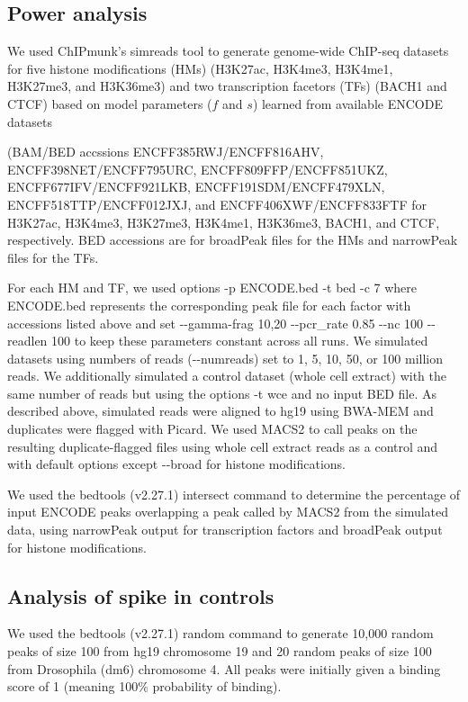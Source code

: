 \documentclass[12pt]{article}
\begin{document}

\subsection*{Power analysis}
We used ChIPmunk's simreads tool to generate genome-wide ChIP-seq datasets for five histone modifications (HMs) (H3K27ac, H3K4me3, H3K4me1, H3K27me3, and H3K36me3) and two transcription facetors (TFs) (BACH1 and CTCF) based on model parameters ($f$ and $s$) learned from available ENCODE datasets

(BAM/BED accssions ENCFF385RWJ/ENCFF816AHV, ENCFF398NET/ENCFF795URC, ENCFF809FFP/ENCFF851UKZ, ENCFF677IFV/ENCFF921LKB, ENCFF191SDM/ENCFF479XLN, ENCFF518TTP/ENCFF012JXJ, and ENCFF406XWF/ENCFF833FTF for
H3K27ac, H3K4me3, H3K27me3, H3K4me1, H3K36me3, BACH1, and CTCF, respectively. BED accessions are for broadPeak files for the HMs and narrowPeak files for the TFs.

For each HM and TF, we used options -p ENCODE.bed -t bed -c 7 where ENCODE.bed represents the corresponding peak file for each factor with accessions listed above and set -{}-gamma-frag 10,20 -{}-pcr\_rate 0.85 -{}-nc 100 -{}-readlen 100 to keep these parameters constant across all runs.
We simulated datasets using numbers of reads (-{}-numreads) set to 1, 5, 10, 50, or 100 million reads.
We additionally simulated a control dataset (whole cell extract) with the same number of reads but using the options -t wce and no input BED file. As described above, simulated reads were aligned to hg19 using BWA-MEM and duplicates were flagged with Picard.
We used MACS2 \cite{MACS2} to call peaks on the resulting duplicate-flagged files using whole cell extract reads as a control and with default options except -{}-broad for histone modifications.

We used the bedtools \cite{bedtools} (v2.27.1) intersect command to determine the percentage of input ENCODE peaks overlapping a peak called by MACS2 from the simulated data, using narrowPeak output for transcription factors and broadPeak output for histone modifications.

\subsection*{Analysis of spike in controls}
We used the bedtools \cite{bedtools} (v2.27.1) random command to generate 10,000 random peaks of size 100 from hg19 chromosome 19 and 20 random peaks of size 100 from Drosophila (dm6) chromosome 4. All peaks were initially given a binding score of 1 (meaning 100\% probability of binding).
\end{document}
